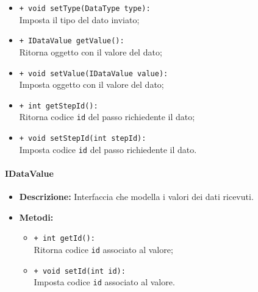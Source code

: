 \begin{flushleft}
\begin{itemize}
\begin{sloppypar}
\begin{itemize}
\item \texttt{+ void setType(DataType type):}\\ Imposta il tipo del dato inviato;
\item \texttt{+ IDataValue getValue():}\\ Ritorna oggetto con il valore del dato;
\item \texttt{+ void setValue(IDataValue value):}\\ Imposta oggetto con il valore del dato;
\item \texttt{+ int getStepId():}\\ Ritorna codice \texttt{id} del passo richiedente il dato;
\item \texttt{+ void setStepId(int stepId):}\\ Imposta codice \texttt{id} del passo richiedente il dato.
\end{itemize}
\end{sloppypar}
\end{itemize}
\end{flushleft}

\paragraph{IDataValue}
\label{botidatavalue}
\begin{flushleft}
\begin{itemize}
\item \textbf{Descrizione:} Interfaccia che modella i valori dei dati ricevuti.
\item \textbf{Metodi:}
\begin{sloppypar}
\begin{itemize}
\item \texttt{+ int getId():}\\ Ritorna codice \texttt{id} associato al valore;
\item \texttt{+ void setId(int id):}\\ Imposta codice \texttt{id} associato al valore.
\end{itemize}
\end{sloppypar}
\end{itemize}
\end{flushleft}

